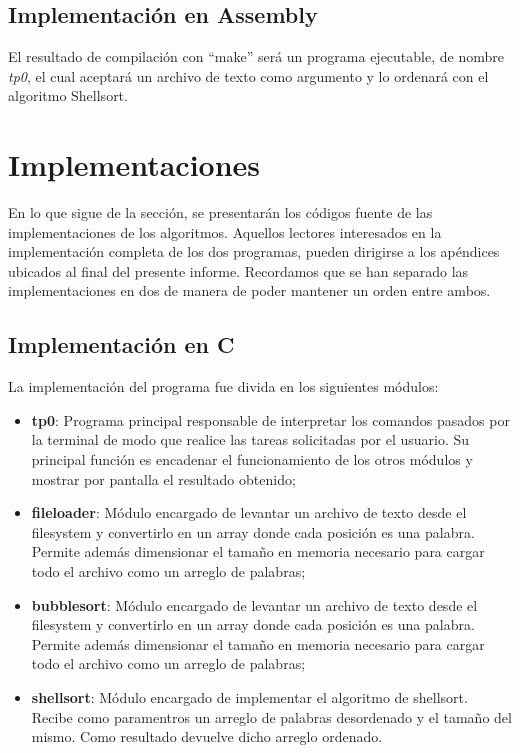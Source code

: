 \documentclass{article}
\begin{document}
\subsection{Implementación en Assembly}

	El resultado de compilación con ``make'' será un programa ejecutable, de nombre \textit{tp0}, el cual aceptará un archivo de texto como argumento y lo ordenará con el algoritmo Shellsort.
\medskip




\section{Implementaciones}
	
	En lo que sigue de la sección, se presentarán los códigos fuente de las implementaciones de los algoritmos. Aquellos lectores interesados en la implementación completa de los dos programas, pueden dirigirse a los apéndices ubicados al final del presente informe. Recordamos que se han separado las implementaciones en dos de manera de poder mantener un orden entre ambos.



\subsection{Implementación en C}

	La implementación del programa fue divida en los siguientes módulos:
	\medskip

\begin{itemize}

\itemsep=2pt \topsep=0pt \partopsep=0pt \parskip=0pt \parsep=0pt
	\item \textbf{tp0}: Programa principal responsable de interpretar los comandos pasados por la terminal de modo que realice las tareas solicitadas por el usuario. Su principal función es encadenar el funcionamiento de los otros módulos y mostrar por pantalla el resultado obtenido;
	\item \textbf{fileloader}: Módulo encargado de levantar un archivo de texto desde el filesystem y convertirlo en un array donde cada posición es una palabra. Permite además dimensionar el tamaño en memoria necesario para cargar todo el archivo como un arreglo de palabras;
	\item \textbf{bubblesort}: Módulo encargado de levantar un archivo de texto desde el filesystem y convertirlo en un array donde cada posición es una palabra. Permite además dimensionar el tamaño en memoria necesario para cargar todo el archivo como un arreglo de palabras;
	\item \textbf{shellsort}: Módulo encargado de implementar el algoritmo de shellsort. Recibe como paramentros un arreglo de palabras desordenado y el tamaño del mismo. Como resultado devuelve dicho arreglo ordenado.

\end{itemize}	
\medskip
\end{document}
